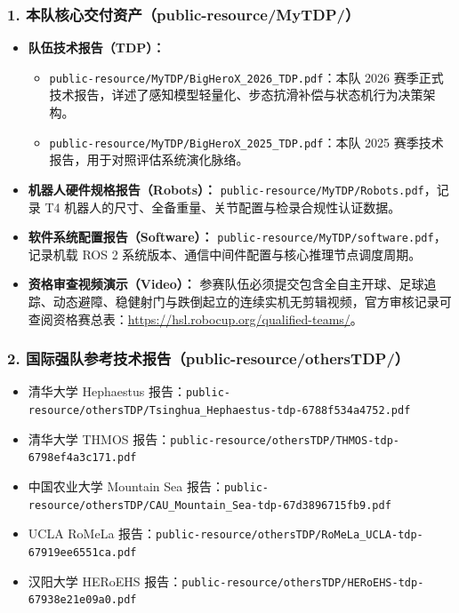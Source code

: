 \subsubsection{1. 本队核心交付资产（public-resource/MyTDP/）}
\begin{itemize}[leftmargin=*]
    \item \textbf{队伍技术报告（TDP）：}
    \begin{itemize}
        \item \texttt{public-resource/MyTDP/BigHeroX\_2026\_TDP.pdf}：本队 2026 赛季正式技术报告，详述了感知模型轻量化、步态抗滑补偿与状态机行为决策架构。
        \item \texttt{public-resource/MyTDP/BigHeroX\_2025\_TDP.pdf}：本队 2025 赛季技术报告，用于对照评估系统演化脉络。
    \end{itemize}
    \item \textbf{机器人硬件规格报告（Robots）：} \texttt{public-resource/MyTDP/Robots.pdf}，记录 T4 机器人的尺寸、全备重量、关节配置与检录合规性认证数据。
    \item \textbf{软件系统配置报告（Software）：} \texttt{public-resource/MyTDP/software.pdf}，记录机载 ROS 2 系统版本、通信中间件配置与核心推理节点调度周期。
    \item \textbf{资格审查视频演示（Video）：} 参赛队伍必须提交包含全自主开球、足球追踪、动态避障、稳健射门与跌倒起立的连续实机无剪辑视频，官方审核记录可查阅资格赛总表：\url{https://hsl.robocup.org/qualified-teams/}。
\end{itemize}

\subsubsection{2. 国际强队参考技术报告（public-resource/othersTDP/）}
\begin{itemize}[leftmargin=*]
    \item 清华大学 Hephaestus 报告：\texttt{public-resource/othersTDP/Tsinghua\_Hephaestus-tdp-6788f534a4752.pdf}
    \item 清华大学 THMOS 报告：\texttt{public-resource/othersTDP/THMOS-tdp-6798ef4a3c171.pdf}
    \item 中国农业大学 Mountain Sea 报告：\texttt{public-resource/othersTDP/CAU\_Mountain\_Sea-tdp-67d3896715fb9.pdf}
    \item UCLA RoMeLa 报告：\texttt{public-resource/othersTDP/RoMeLa\_UCLA-tdp-67919ee6551ca.pdf}
    \item 汉阳大学 HERoEHS 报告：\texttt{public-resource/othersTDP/HERoEHS-tdp-67938e21e09a0.pdf}
\end{itemize}

\newpage